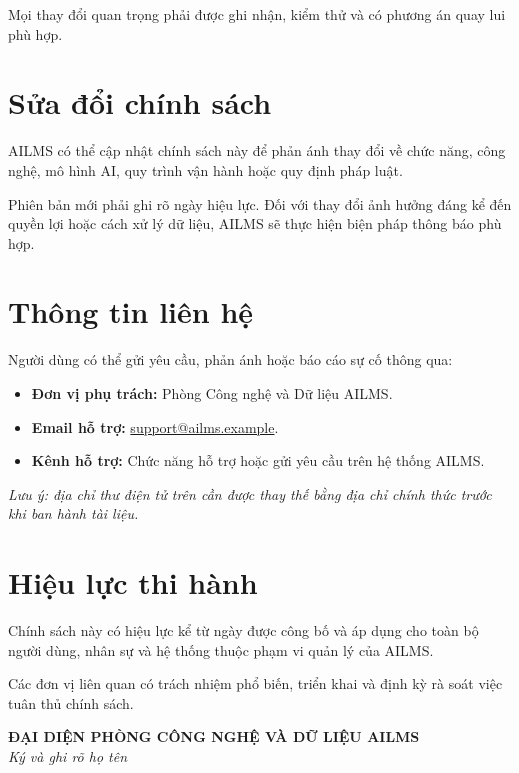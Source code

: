 \documentclass[12pt,a4paper]{article}
\begin{document}
Mọi thay đổi quan trọng phải được ghi nhận, kiểm thử và có phương án quay lui phù hợp.

\section{Sửa đổi chính sách}

AILMS có thể cập nhật chính sách này để phản ánh thay đổi về chức năng,
công nghệ, mô hình AI, quy trình vận hành hoặc quy định pháp luật.

Phiên bản mới phải ghi rõ ngày hiệu lực. Đối với thay đổi ảnh hưởng đáng kể
đến quyền lợi hoặc cách xử lý dữ liệu, AILMS sẽ thực hiện biện pháp thông báo phù hợp.

\section{Thông tin liên hệ}

Người dùng có thể gửi yêu cầu, phản ánh hoặc báo cáo sự cố thông qua:

\begin{itemize}
    \item \textbf{Đơn vị phụ trách:} Phòng Công nghệ và Dữ liệu AILMS.
    \item \textbf{Email hỗ trợ:} \href{mailto:support@ailms.example}{support@ailms.example}.
    \item \textbf{Kênh hỗ trợ:} Chức năng hỗ trợ hoặc gửi yêu cầu trên hệ thống AILMS.
\end{itemize}

\textit{Lưu ý: địa chỉ thư điện tử trên cần được thay thế bằng địa chỉ chính thức
trước khi ban hành tài liệu.}

\section{Hiệu lực thi hành}

Chính sách này có hiệu lực kể từ ngày được công bố và áp dụng cho toàn bộ
người dùng, nhân sự và hệ thống thuộc phạm vi quản lý của AILMS.

Các đơn vị liên quan có trách nhiệm phổ biến, triển khai và định kỳ rà soát
việc tuân thủ chính sách.

\vfill

\begin{center}
    \textbf{ĐẠI DIỆN PHÒNG CÔNG NGHỆ VÀ DỮ LIỆU AILMS}\\[1.5cm]
    \textit{Ký và ghi rõ họ tên}
\end{center}
\end{document}
